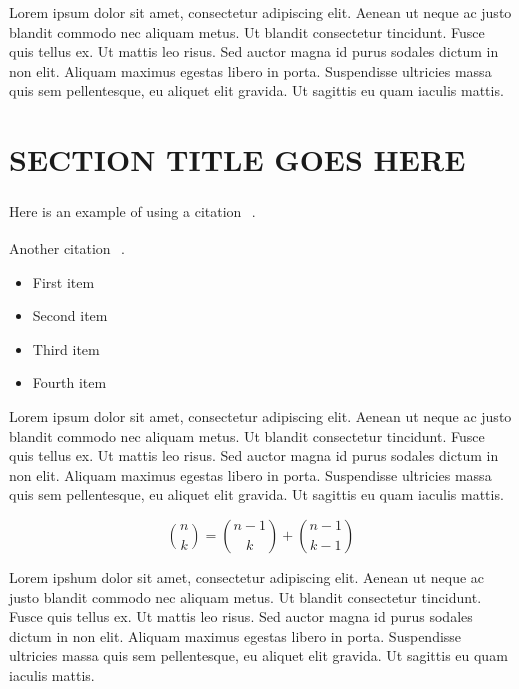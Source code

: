 \documentclass{csmagazine}
\begin{document}
\begin{flushleft}
Lorem ipsum dolor sit amet, consectetur adipiscing elit. Aenean ut neque ac justo blandit commodo nec aliquam metus. Ut blandit consectetur tincidunt. Fusce quis tellus ex. Ut mattis leo risus. Sed auctor magna id purus sodales dictum in non elit. Aliquam maximus egestas libero in porta. Suspendisse ultricies massa quis sem pellentesque, eu aliquet elit gravida. Ut sagittis eu quam iaculis mattis.

\section*{SECTION TITLE GOES HERE}

Here is an example of using a citation \textsuperscript{~\cite{Lamport1994a}}.

Another citation \textsuperscript{~\cite{Goossens1997}}.


\begin{itemize}
	\item First item
	\item Second item
	\item Third item
	\item Fourth item
\end{itemize}

Lorem ipsum dolor sit amet, consectetur adipiscing elit. Aenean ut neque ac justo blandit commodo nec aliquam metus. Ut blandit consectetur tincidunt. Fusce quis tellus ex. Ut mattis leo risus. Sed auctor magna id purus sodales dictum in non elit. Aliquam maximus egestas libero in porta. Suspendisse ultricies massa quis sem pellentesque, eu aliquet elit gravida. Ut sagittis eu quam iaculis mattis.



\[\binom{n}{k} =\binom{n-1}{k} + \binom{n-1}{k-1}\]

Lorem ipshum dolor sit amet, consectetur adipiscing elit. Aenean ut neque ac justo blandit commodo nec aliquam metus. Ut blandit consectetur tincidunt. Fusce quis tellus ex. Ut mattis leo risus. Sed auctor magna id purus sodales dictum in non elit. Aliquam maximus egestas libero in porta. Suspendisse ultricies massa quis sem pellentesque, eu aliquet elit gravida. Ut sagittis eu quam iaculis mattis.


\end{flushleft}

\end{document}
